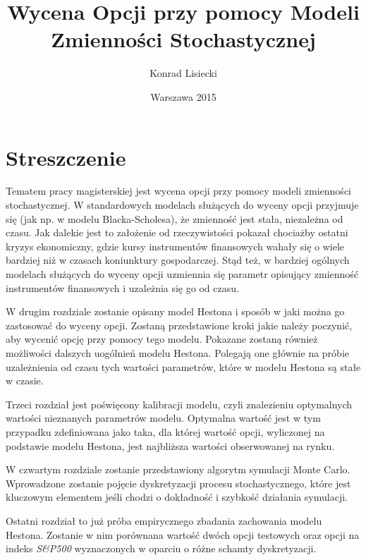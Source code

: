 \documentclass{pracamgr}
\author{Konrad Lisiecki}
\title{Wycena Opcji przy pomocy Modeli Zmienności Stochastycznej}
\date{Warszawa 2015}
\begin{document}
\maketitle

\cleardoublepage
{}
\chapter*{Streszczenie} 
 


Tematem pracy magisterskiej jest wycena opcji przy pomocy modeli zmienności stochastycznej. 
W standardowych modelach służących do wyceny opcji przyjmuje się (jak np. w modelu 
Blacka-Scholesa), że zmienność jest stała, niezależna od czasu. 
Jak dalekie jest to założenie od rzeczywistości pokazał chociażby ostatni kryzys 
ekonomiczny, gdzie kursy instrumentów finansowych wahały się o wiele bardziej niż w czasach
koniunktury gospodarczej. Stąd też, w bardziej ogólnych modelach służących do wyceny opcji uzmiennia 
się parametr opisujący zmienność instrumentów finansowych i uzależnia się go od czasu. 

W drugim rozdziale zostanie opisany model Hestona i sposób w jaki można go zastosować do wyceny 
opcji. Zostaną przedstawione kroki jakie należy poczynić, aby wycenić opcję przy pomocy tego modelu.
Pokazane zostaną również możliwości dalszych uogólnień modelu Hestona. 
Polegają one głównie na próbie uzależnienia od czasu tych wartości parametrów, które w 
modelu Hestona są stałe w czasie.

Trzeci rozdział jest poświęcony kalibracji modelu, czyli znalezieniu 
optymalnych wartości nieznanych parametrów modelu. Optymalna wartość jest w tym przypadku zdefiniowana
jako taka, dla której wartość opcji, wyliczonej na podstawie modelu Hestona, jest najbliższa wartości 
obserwowanej na rynku.

W czwartym rozdziale zostanie przedstawiony algorytm symulacji Monte Carlo. 
Wprowadzone zostanie pojęcie dyskretyzacji procesu stochastycznego, które jest kluczowym elementem
jeśli chodzi o dokładność i szybkość działania symulacji. 


Ostatni rozdział to już próba empirycznego zbadania zachowania modelu Hestona. Zostanie w nim 
porównana wartość dwóch opcji testowych oraz opcji na indeks \textit{S\&P500} wyznaczonych w oparciu o  
różne schamty dyskretyzacji.
\end{document}
